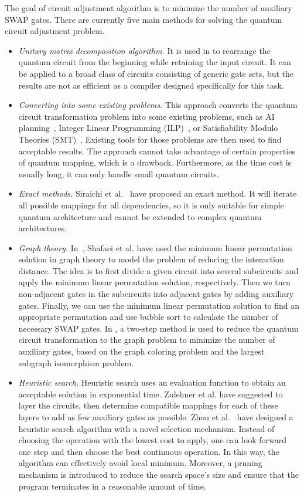 \documentclass[journal]{IEEEtran}
\begin{document}
The goal of circuit adjustment algorithm is to minimize the number of auxiliary SWAP gates. There are currently five main methods for solving the quantum circuit adjustment problem.
\begin{itemize}
  \item
\emph{Unitary matrix decomposition algorithm.} It is used in \cite{2019CNOT,2019Quantum} to rearrange the quantum circuit from the beginning while retaining the input circuit. It can be applied to a broad class of circuits consisting of generic gate sets, but the results are not as efficient as a compiler designed specifically for this task.
\item
\emph{Converting into some existing problems.} This approach converts the quantum circuit transformation problem into some existing problems, such as AI planning~\cite{2017Temporal,2018Integer}, Integer Linear Programming (ILP)~\cite{2019Almeida}, or Satisfiability Modulo Theories (SMT)~\cite{2019Murali}. Existing tools for those problems are then used to find acceptable results. The approach cannot take advantage of certain properties of quantum mapping, which is a drawback. Furthermore, as the time cost is usually long, it can only handle small quantum circuits.
\item
\emph{Exact methods.}
Siraichi et al.~\cite{2018QubitSiraichi} have proposed an exact method. It will iterate all possible mappings for all dependencies, so it is only suitable for simple quantum architecture and cannot be extended to complex quantum architectures.
\item
\emph{Graph theory.} 
In~\cite{Shafaei2013}, Shafaei et al. have used the minimum linear permutation solution in graph theory to model the problem of reducing the interaction distance. The idea is to first divide a given circuit into several subcircuits and apply the minimum linear permutation solution, respectively. Then we turn non-adjacent gates in the subcircuits into adjacent gates by adding auxiliary gates. Finally, we can use the minimum linear permutation solution to find an appropriate permutation and use bubble sort to calculate the number of necessary SWAP gates. In \cite{Guerreschi2018,Matsuo2019}, a two-step method is used to reduce the quantum circuit transformation to the graph problem to minimize the number of auxiliary gates, based on the graph coloring problem and the largest subgraph isomorphism problem.
\item
\emph{Heuristic search.}
Heuristic search uses an evaluation function to obtain an acceptable solution in exponential time. Zulehner et al. \cite{Zulehner2017} have suggested to layer the circuits, then determine compatible mappings for each of these layers to add as few auxiliary gates as possible. Zhou et al.~\cite{Xiangzhen2020} have designed a heuristic search algorithm with a novel selection mechanism. Instead of choosing the operation with the lowest cost to apply, one can look forward one step and then choose the best continuous operation. In this way, the algorithm can effectively avoid local minimum. Moreover, a pruning mechanism is introduced to reduce the search space's size and ensure that the program terminates in a reasonable amount of time.


\end{itemize}
\end{document}
